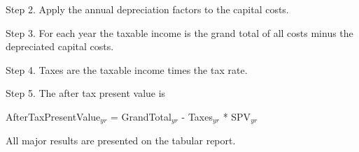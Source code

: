 Step 2. Apply the annual depreciation factors to the capital costs.

Step 3. For each year the taxable income is the grand total of all costs minus the depreciated capital costs.

Step 4. Taxes are the taxable income times the tax rate.

Step 5. The after tax present value is

AfterTaxPresentValue\(_{yr}\) = GrandTotal\(_{yr}\) - Taxes\(_{yr}\) * SPV\(_{yr}\)

All major results are presented on the tabular report.
